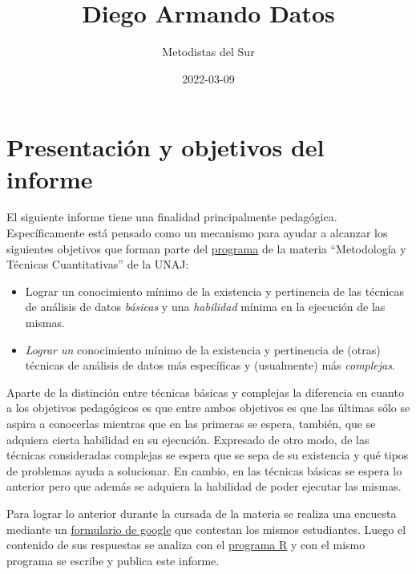 \documentclass[
]{book}
\title{Diego Armando Datos}
\author{Metodistas del Sur}
\date{2022-03-09}
\theoremstyle{definition}
\theoremstyle{definition}
\theoremstyle{definition}
\theoremstyle{definition}
\theoremstyle{remark}
\begin{document}
\maketitle

{
\setcounter{tocdepth}{1}
\tableofcontents
}
\hypertarget{presentaciuxf3n-y-objetivos-del-informe}{%
\chapter*{Presentación y objetivos del informe}\label{presentaciuxf3n-y-objetivos-del-informe}}

El siguiente informe tiene una finalidad principalmente pedagógica. Específicamente está pensado como un mecanismo para ayudar a alcanzar los siguientes objetivos que forman parte del \href{https://docs.google.com/document/d/15ZuHJ1ZM7Z0g0Edt-mv1PCB697-x6-rZfcWdAtd85yM/edit\#heading=h.s43n504lcmmx}{programa} de la materia ``Metodología y Técnicas Cuantitativas'' de la UNAJ:

\begin{itemize}
\item
  Lograr un conocimiento mínimo de la existencia y pertinencia de las técnicas de análisis de datos \emph{básicas} y una \emph{habilidad} mínima en la ejecución de las mismas.
\item
  \emph{Lograr un} conocimiento mínimo de la existencia y pertinencia de (otras) técnicas de análisis de datos más específicas y (usualmente) más \emph{complejas}.
\end{itemize}

Aparte de la distinción entre técnicas básicas y complejas la diferencia en cuanto a los objetivos pedagógicos es que entre ambos objetivos es que las últimas sólo se aspira a conocerlas mientras que en las primeras se espera, también, que se adquiera cierta habilidad en su ejecución. Expresado de otro modo, de las técnicas consideradas complejas se espera que se sepa de su existencia y qué tipos de problemas ayuda a solucionar. En cambio, en las técnicas básicas se espera lo anterior pero que además se adquiera la habilidad de poder ejecutar las mismas.

Para lograr lo anterior durante la cursada de la materia se realiza una encuesta mediante un \href{https://www.google.com/intl/es-419_ar/forms/about/}{formulario de google} que contestan los mismos estudiantes. Luego el contenido de sus respuestas se analiza con el \href{https://www.r-project.org/}{programa R} y con el mismo programa se escribe y publica este informe.
\end{document}
